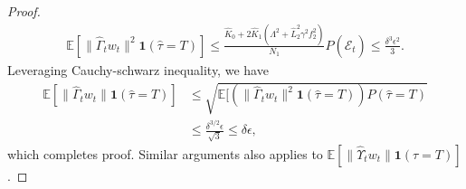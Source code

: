 \documentclass[twoside]{article} %
\theoremstyle{plain}
\theoremstyle{definition}
\theoremstyle{remark}
\newcommand{\HGamma}{\hat{\Gamma}}
\newcommand{\HUpsilon}{\hat{\Upsilon}}
\newcommand{\hL}{\hat{L}}
\newcommand{\htau}{\hat{\tau}}
\newcommand{\calhatE}{\mathcal{\hat{E}}}
\begin{document}
\begin{proof}
    \begin{align}
        \mathbb{E}[\|\HGamma_tw_t\|^2\mathbf{1}(\htau=T)]\leq \frac{\hat{K}_0+2\hat{K}_1( \Lambda^2+{\hL}_2^2 \gamma^2 f_2^2) }{N_1} P(\calhatE_t)\leq \frac{\delta^3\epsilon^2}{3}.
    \end{align}
    Leveraging Cauchy-schwarz inequality, we have
    \begin{align}
        \mathbb{E}[\|\HGamma_tw_t\|\mathbf{1}(\htau=T)] 
        &\leq \sqrt{\mathbb{E}[(\|\HGamma_tw_t\|^2\mathbf{1}(\htau = T))P(\htau=T)}\nonumber\\
        &\leq \frac{\delta^{3/2}\epsilon}{\sqrt{3}}\leq \delta\epsilon,
    \end{align}
    which completes proof. Similar arguments also applies to $\mathbb{E}[\|\HUpsilon_tw_t\|\mathbf{1}(\tau = T)]$.
\end{proof}





%
%



\end{document}

